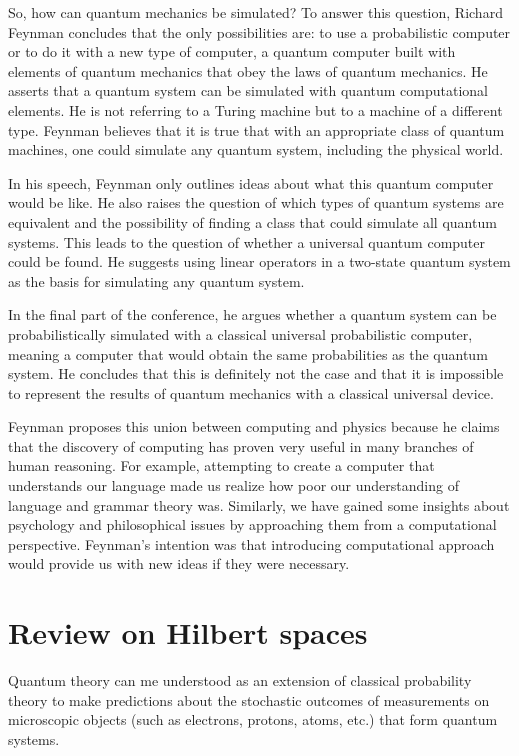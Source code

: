 So, how can quantum mechanics be simulated? To answer this question, Richard Feynman concludes that the only possibilities are: to use a probabilistic computer or to do it with a new type of computer, a quantum computer built with elements of quantum mechanics that obey the laws of quantum mechanics. He asserts that a quantum system can be simulated with quantum computational elements. He is not referring to a Turing machine but to a machine of a different type. Feynman believes that it is true that with an appropriate class of quantum machines, one could simulate any quantum system, including the physical world.

In his speech, Feynman only outlines ideas about what this quantum computer would be like. He also raises the question of which types of quantum systems are equivalent and the possibility of finding a class that could simulate all quantum systems. This leads to the question of whether a universal quantum computer could be found. He suggests using linear operators in a two-state quantum system as the basis for simulating any quantum system.

In the final part of the conference, he argues whether a quantum system can be probabilistically simulated with a classical universal probabilistic computer, meaning a computer that would obtain the same probabilities as the quantum system. He concludes that this is definitely not the case and that it is impossible to represent the results of quantum mechanics with a classical universal device.

Feynman proposes this union between computing and physics because he claims that the discovery of computing has proven very useful in many branches of human reasoning. For example, attempting to create a computer that understands our language made us realize how poor our understanding of language and grammar theory was. Similarly, we have gained some insights about psychology and philosophical issues by approaching them from a computational perspective. Feynman's intention was that introducing computational approach would provide us with new ideas if they were necessary.

\section{Review on Hilbert spaces}
Quantum theory can me understood as an extension of classical probability theory to make predictions about the stochastic outcomes of measurements on microscopic objects (such as electrons, protons, atoms, etc.) that form quantum systems.

